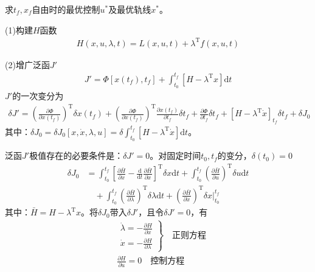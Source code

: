             求$t_f,x_f$自由时的最优控制$u^*$及最优轨线$x^*$。
            \par
            (1)构建$H$函数
            \begin{align*}
            H(x,u,\lambda,t) = L(x,u,t)+\lambda^\mathrm{T}f(x,u,t)
            \end{align*}
            \par
            (2)增广泛函$J'$
            \begin{align*}
            J'= \Phi[x(t_f),t_f]+\int_{t_0}^{t_f}[H - \lambda^\mathrm{T}x]\mathrm{d}t
            \end{align*}
            $J'$的一次变分为
            \begin{align*}
            \delta J' = \left( \frac{\partial \Phi}{\partial x(t_f)} \right)^\mathrm{T} \delta x(t_f) + \left( \frac{\partial \Phi}{\partial x(t_f)} \right)^\mathrm{T} \frac{\partial x(t_f)}{\partial t_f}\delta t_f+ \frac{\partial \Phi}{\partial t_f}\delta t_f+ [H-\lambda^\mathrm{T}\dot{x}]_{t_f} \delta t_f + \delta J_0
            \end{align*}
            其中：$\delta J_0 = \delta J_0[x,\dot{x},\lambda,u] = \delta \int_{t_0}^{t_f}[H-\lambda^\mathrm{T}\dot{x}]\mathrm{d}t$。
            \par
            泛函$J'$极值存在的必要条件是：$\delta J' = 0$。对固定时间$t_0,t_f$的变分，$\delta (t_0) = 0$
            \begin{align*}
            \delta J_0 &= \int_{t_0}^{t_f} \left[\frac{\partial \bar{H}}{\partial x} - \frac{\mathrm{d}}{\mathrm{d}t}\frac{\partial \bar{H}}{\partial \dot{x}}\right]^\mathrm{T}\delta x\mathrm{d}t +\int_{t_0}^{t_f} \left( \frac{\partial \bar{H}}{\partial u} \right) ^\mathrm{T}\delta u\mathrm{d}t\\
            &\quad +\int_{t_0}^{t_f} \left( \frac{\partial \bar{H}}{\partial \lambda} \right) ^\mathrm{T}\delta \lambda \mathrm{d}t+ \left( \frac{\partial \bar{H}}{\partial \dot{x}} \right)^\mathrm{T} \delta x\Big|_{t_0}^{t_f}
            \end{align*}
            其中：$\bar{H} = H - \lambda ^\mathrm{T}x$。将$\delta J_0$带入$\delta J'$，且令$\delta J'=0$，有
            \begin{align*}
            & \left.
            \begin{aligned}
            \dot{\lambda} = -\frac{\partial H}{\partial x}\\
            \dot{x} = -\frac{\partial H}{\partial \lambda}
            \end{aligned}
            \right\}
            \quad \text{正则方程}\\
            & \frac{\partial H}{\partial u} = 0\quad \text{控制方程}
            \end{align*}
